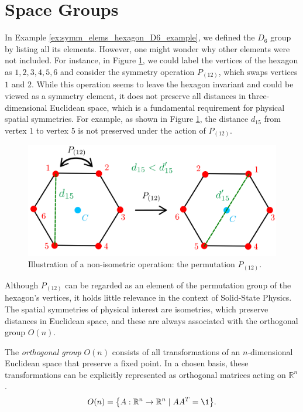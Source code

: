 \section{Space Groups} \label{sec:space_groups}

In Example \ref{ex:symm_elems_hexagon_D6_example}, we defined the \(D_6\) group by listing all its elements. However, one might wonder why other elements were not included. For instance, in Figure \ref{fig:hexagon_perm_12}, we could label the vertices of the hexagon as \(1, 2, 3, 4, 5, 6\) and consider the symmetry operation \(P_{(12)}\), which swaps vertices \(1\) and \(2\). While this operation seems to leave the hexagon invariant and could be viewed as a symmetry element, it does not preserve all distances in three-dimensional Euclidean space, which is a fundamental requirement for physical spatial symmetries. For example, as shown in Figure \ref{fig:hexagon_perm_12}, the distance \(d_{15}\) from vertex \(1\) to vertex \(5\) is not preserved under the action of \(P_{(12)}\).

\begin{figure}[H]
\centering
\includegraphics[width=0.8\linewidth]{fig/hexagon_perm_12.png}
\caption{Illustration of a non-isometric operation: the permutation \(P_{(12)}\).}
\label{fig:hexagon_perm_12}
\end{figure}

Although \(P_{(12)}\) can be regarded as an element of the permutation group of the hexagon’s vertices, it holds little relevance in the context of Solid-State Physics. The spatial symmetries of physical interest are isometries, which preserve distances in Euclidean space, and these are always associated with the orthogonal group \(O(n)\).

\begin{definition} \label{def:orthogonal_group}
The \textit{orthogonal group} \(O(n)\) consists of all transformations of an \(n\)-dimensional Euclidean space that preserve a fixed point. In a chosen basis, these transformations can be explicitly represented as orthogonal matrices acting on \(\mathbb{R}^n\).
\begin{equation} \label{eq:O(n)}
O(n) = \qty{A: \mathbb{R}^n \to \mathbb{R}^n \mid A A^T = \1}.
\end{equation}
\end{definition}


